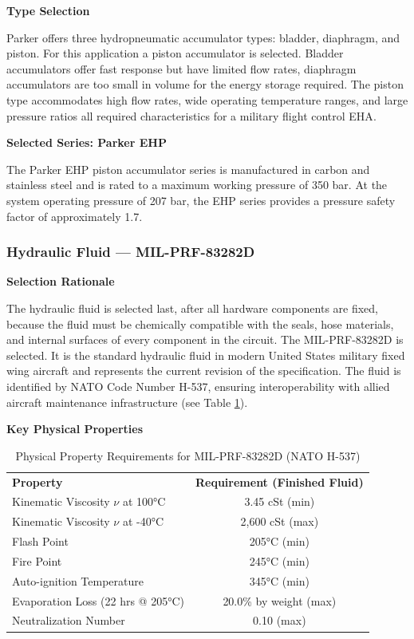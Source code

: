 \documentclass[
bindingoffset=5mm,  %
footnoteindent=3mm, %
hyphenation=true    %
]{src/wut-thesis}
\begin{document}
	\textbf{Type Selection}
	
	Parker offers three hydropneumatic accumulator types: bladder, diaphragm, and piston. For this application a piston accumulator is selected. Bladder accumulators offer fast response but have limited flow rates, diaphragm accumulators are too small in volume for the energy storage required. The piston type accommodates high flow rates, wide operating temperature ranges, and large pressure ratios  all required characteristics for a military flight control EHA\cite{parker_accumulator_choice, parker_ehp_europe}.
	
	\textbf{Selected Series: Parker EHP}
	
	The Parker EHP piston accumulator series is manufactured in carbon and stainless steel and is rated to a maximum working pressure of 350 bar. At the system operating pressure of 207 bar, the EHP series provides a pressure safety factor of approximately 1.7.
	
	\subsubsection{Hydraulic Fluid --- MIL-PRF-83282D}
	
	\textbf{Selection Rationale}
	
	The hydraulic fluid is selected last, after all hardware components are fixed, because the fluid must be chemically compatible with the seals, hose materials, and internal surfaces of every component in the circuit. The MIL-PRF-83282D is selected. It is the standard hydraulic fluid in modern United States military fixed wing aircraft and represents the current revision of the specification. The fluid is identified by NATO Code Number H-537, ensuring interoperability with allied aircraft maintenance infrastructure (see Table \ref{tab:mil_prf_83282d}).
	
	\textbf{Key Physical Properties}
	\begin{table}[htbp]
		\centering
		\begin{tabular}{l c}
			\toprule
			\textbf{Property} & \textbf{Requirement (Finished Fluid)} \\
			Kinematic Viscosity $\nu$  at 100°C & 3.45 cSt (min) \\
			Kinematic Viscosity $\nu$  at -40°C & 2,600 cSt (max) \\
			Flash Point  & 205°C (min)  \\
			Fire Point & 245°C (min)  \\
			Auto-ignition Temperature & 345°C (min) \\
			Evaporation Loss (22 hrs @ 205°C) & 20.0\% by weight (max)  \\
			Neutralization Number & 0.10 (max)  \\
			\bottomrule
		\end{tabular}
		\caption{Physical Property Requirements for MIL-PRF-83282D (NATO H-537)\cite{mil_prf_83282d}}
		\label{tab:mil_prf_83282d}
	\end{table}
	
\end{document}
